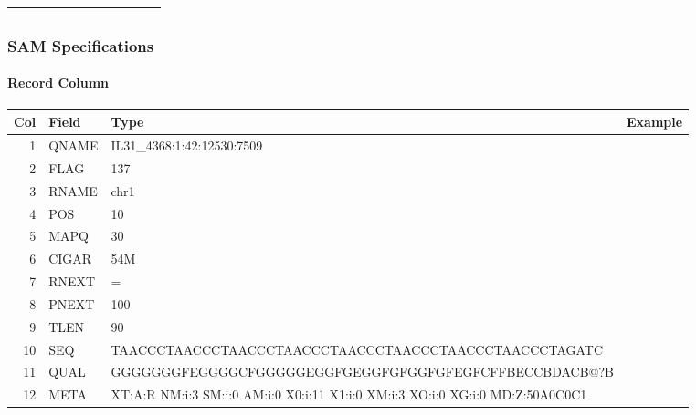\documentclass[xcolor=table]{beamer}
\begin{document}
\begin{frame}[fragile]
\begin{table}[]
{\begin{tabular}{|l|l|l|l|l|l|l|l|l|l|l|l|}
{\color[HTML]{FFFFFF} }                                         & {\color[HTML]{FFFFFF} }                                    & {\color[HTML]{FFFFFF} }                                     & {\color[HTML]{FFFFFF} }                                   & {\color[HTML]{FFFFFF} }                                    & {\color[HTML]{FFFFFF} }                                     & {\color[HTML]{FFFFFF} }                                         & {\color[HTML]{FFFFFF} }                                         & {\color[HTML]{FFFFFF} }                                    & {\color[HTML]{FFFFFF} }                                   & {\color[HTML]{FFFFFF} }                                     & {\color[HTML]{FFFFFF} }                                          \\ \hline
\end{tabular}
}
\end{table}

\end{frame}

\begin{frame}[fragile]
\frametitle{SAM Specifications}
\framesubtitle{Record Column}
\begin{center}
\small
\begin{tabular}{rlll}
  \hline
  {\bf Col} & {\bf Field} & {\bf Type} & {\bf Example} \\
  \hline
  1 & {\sf QNAME} & IL31\_4368:1:42:12530:7509\\
  2 & {\sf FLAG} & 137 \\
  3 & {\sf RNAME} & chr1\\
  4 & {\sf POS} & 10 \\
  5 & {\sf MAPQ} & 30 \\
  6 & {\sf CIGAR} & 54M \\
  7 & {\sf RNEXT} & =\\
  8 & {\sf PNEXT} & 100  \\
  9 & {\sf TLEN} & 90 \\
  10 & {\sf SEQ} & TAACCCTAACCCTAACCCTAACCCTAACCCTAACCCTAACCCTAACCCTAGATC\\
  11 & {\sf QUAL} & GGGGGGGFEGGGGCFGGGGGEGGFGEGGFGFGGFGFEGFCFFBECCBDACB@?B \\
  12 & {\sf META} & XT:A:R NM:i:3 SM:i:0 AM:i:0	X0:i:11	X1:i:0 XM:i:3 XO:i:0 XG:i:0 MD:Z:50A0C0C1 \\
\end{tabular}
\end{center}
\end{frame}
\end{document}
